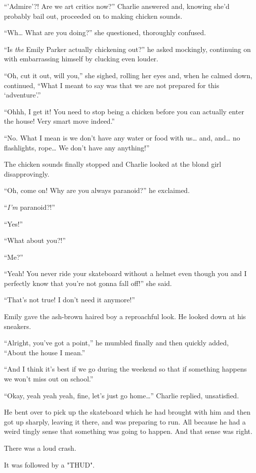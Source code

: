 “’Admire’?! Are we art critics now?” Charlie answered and, knowing she'd probably bail out, proceeded on to making chicken sounds.

“Wh… What are you doing?” she questioned, thoroughly confused.

“Is \textit{the} Emily Parker actually chickening out?” he asked mockingly, continuing on with embarrassing himself by clucking even louder.

“Oh, cut it out, will you,” she sighed, rolling her eyes and, when he calmed down, continued, “What I meant to say was that we are not prepared for this ‘adventure’.”

“Ohhh, I get it! You need to stop being a chicken before you can actually enter the house! Very smart move indeed.”

“No. What I mean is we don’t have any water or food with us… and, and… no flashlights, rope… We don’t have any anything!”

The chicken sounds finally stopped and Charlie looked at the blond girl disapprovingly.

“Oh, come on! Why are you always paranoid?” he exclaimed.

“\textit{I’m} paranoid?!”

“Yes!”

“What about you?!”

“Me?”

“Yeah! You never ride your skateboard without a helmet even though you and I perfectly know that you’re not gonna fall off!” she said.

“That’s not true! I don’t need it anymore!”

Emily gave the ash-brown haired boy a reproachful look. He looked down at his sneakers.

“Alright, you’ve got a point,” he mumbled finally and then quickly added, “About the house I mean.”

“And I think it’s best if we go during the weekend so that if something happens we won't miss out on school.”

“Okay, yeah yeah yeah, fine, let’s just go home…” Charlie replied, unsatisfied.

He bent over to pick up the skateboard which he had brought with him and then got up sharply, leaving it there, and was preparing to run. All because he had a weird tingly sense that something was going to happen. And that sense was right.

There was a loud crash.

It was followed by a "THUD".


